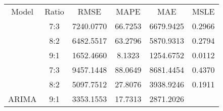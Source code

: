 \documentclass{ieeeojies}
\begin{document}
{\renewcommand{\arraystretch}{0.5}

\begin{table}[H]

\begin{tabular}{|cccccc|}
\hline
\rowcolor[HTML]{F7C8B7} 
\multicolumn{6}{|c|}{\cellcolor[HTML]{F7C8B7}AGR} \\ \hline
\multicolumn{1}{|c|}{Model} &
  \multicolumn{1}{c|}{Ratio} &
  \multicolumn{1}{c|}{RMSE} &
  \multicolumn{1}{c|}{MAPE} &
  \multicolumn{1}{c|}{MAE} &
  \multicolumn{1}{c|}{MSLE} \\ \hline
\rowcolor[HTML]{E6EFFD} 
\multicolumn{1}{|c|}{\cellcolor[HTML]{E6EFFD}} &
  \multicolumn{1}{c|}{\cellcolor[HTML]{E6EFFD}7:3} &
  \multicolumn{1}{c|}{\cellcolor[HTML]{E6EFFD}7240.0770} &
  \multicolumn{1}{c|}{\cellcolor[HTML]{E6EFFD}66.7253} &
  \multicolumn{1}{c|}{\cellcolor[HTML]{E6EFFD}6679.9425} &
  0.2966 \\ \cline{2-6} 
\rowcolor[HTML]{E6EFFD} 
\multicolumn{1}{|c|}{\cellcolor[HTML]{E6EFFD}} &
  \multicolumn{1}{c|}{\cellcolor[HTML]{E6EFFD}8:2} &
  \multicolumn{1}{c|}{\cellcolor[HTML]{E6EFFD}6482.5517} &
  \multicolumn{1}{c|}{\cellcolor[HTML]{E6EFFD}63.2796} &
  \multicolumn{1}{c|}{\cellcolor[HTML]{E6EFFD}5870.9313} &
  0.2794 \\ \cline{2-6} 
\rowcolor[HTML]{E6EFFD} 
\multicolumn{1}{|c|}{\multirow{-3}{*}{\cellcolor[HTML]{E6EFFD}LR}} &
  \multicolumn{1}{c|}{\cellcolor[HTML]{E6EFFD}9:1} &
  \multicolumn{1}{c|}{\cellcolor[HTML]{E6EFFD}1652.4660} &
  \multicolumn{1}{c|}{\cellcolor[HTML]{E6EFFD}8.1323} &
  \multicolumn{1}{c|}{\cellcolor[HTML]{E6EFFD}1254.6752} &
  0.0112 \\ \hline
\multicolumn{1}{|c|}{} &
  \multicolumn{1}{c|}{7:3} &
  \multicolumn{1}{c|}{\cellcolor[HTML]{FFFFFF}9457.1448} &
  \multicolumn{1}{c|}{\cellcolor[HTML]{FFFFFF}88.0649} &
  \multicolumn{1}{c|}{\cellcolor[HTML]{FFFFFF}8681.4454} &
  \cellcolor[HTML]{FFFFFF}0.4370 \\ \cline{2-6} 
\multicolumn{1}{|c|}{} &
  \multicolumn{1}{c|}{8:2} &
  \multicolumn{1}{c|}{\cellcolor[HTML]{FFFFFF}5097.7512} &
  \multicolumn{1}{c|}{\cellcolor[HTML]{FFFFFF}27.8076} &
  \multicolumn{1}{c|}{\cellcolor[HTML]{FFFFFF}3938.9246} &
  \cellcolor[HTML]{FFFFFF}0.1911 \\ \cline{2-6} 
\multicolumn{1}{|c|}{\multirow{-3}{*}{ARIMA}} &
  \multicolumn{1}{c|}{9:1} &
  \multicolumn{1}{c|}{\cellcolor[HTML]{FFFFFF}3353.1553} &
  \multicolumn{1}{c|}{\cellcolor[HTML]{FFFFFF}17.7313} &
  \multicolumn{1}{c|}{\cellcolor[HTML]{FFFFFF}2871.2026} &

\end{tabular}
\end{table}}
\end{document}
